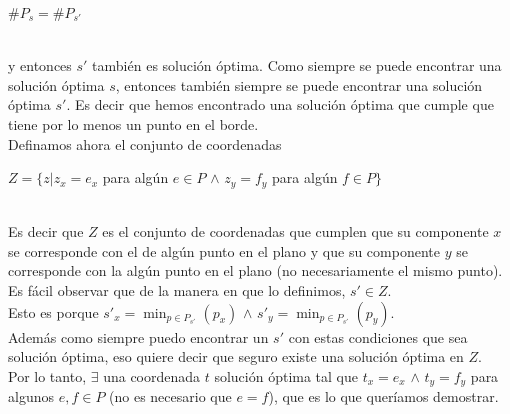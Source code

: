 \begin{center}
$\#P_{s} = \#P_{s'}$
\end{center}\\

y entonces $s'$ tambi\'en es soluci\'on \'optima. Como siempre se puede encontrar una soluci\'on \'optima $s$, entonces tambi\'en siempre se puede encontrar una soluci\'on \'optima $s'$. Es decir que hemos encontrado una soluci\'on \'optima que cumple que tiene por lo menos un punto en el borde.\\

\indent Definamos ahora el conjunto de coordenadas\\
\begin{center}
$Z = \{z | z_{x}= e_{x} $ para alg\'un $e \in P$  $\wedge$ $z_{y}= f_{y}$ para alg\'un $f \in P\}$
\end{center}\\

\indent Es decir que $Z$ es el conjunto de coordenadas que cumplen que su componente $x$ se corresponde con el de alg\'un punto en el plano y que su componente $y$ se corresponde con la alg\'un punto en el plano (no necesariamente el mismo punto).\\

\indent Es fácil observar que de la manera en que lo definimos, $s' \in Z $.\\ 
\indent Esto es porque $s'_{x} =  \min_{p \in P_{s'}}(p_{x})$  $\wedge$  $s'_{y} =  \min_{p \in P_{s'}}(p_{y})$. \\
\indent  Adem\'as como siempre puedo encontrar un $s'$ con estas condiciones que sea soluci\'on \'optima, eso quiere decir que seguro existe una soluci\'on \'optima en $Z$.\\
\indent Por lo tanto, $\exists$ una coordenada $t$ soluci\'on \'optima tal que $t_{x} = e_{x}$ $\wedge$ $t_{y}=f_{y}$ para algunos $e,f \in P$ (no es necesario que $e=f$), que es lo que quer\'iamos demostrar.\\


